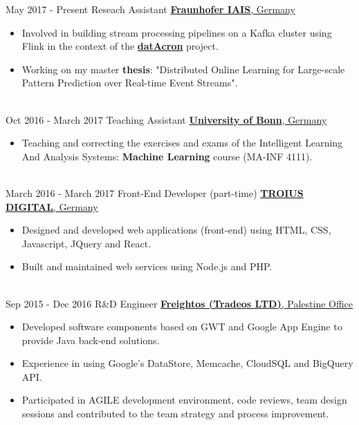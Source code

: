 \documentclass[letterpaper]{twentysecondcv} %
\begin{document}
\begin{twenty} %
	
	\twentyitem
	{May 2017 -}
	{Present}
	{Reseach Assistant}
	{\href{https://www.iais.fraunhofer.de/?L=1}{\large\textbf{Fraunhofer IAIS}, Germany}}
	{}
	{\begin{itemize}
			\item Involved in building stream processing pipelines on a Kafka cluster using Flink in the context of the \href{http://www.datacron-project.eu/}{\textbf{datAcron}} project.
			
			\item Working on my master \textbf{thesis}: "Distributed Online Learning for Large-scale Pattern Prediction over Real-time Event Streams".
	\end{itemize}}
\\
		\twentyitem
	{Oct 2016 - }
	{March 2017}
	{Teaching Assistant}
	{\href{https://www.kdml.iai.uni-bonn.de/teaching/winter-2016-17}{\large\textbf{University of Bonn}, Germany}}
	{}
	 {\begin{itemize}
			\item Teaching and correcting the exercises and exams of the Intelligent Learning ​ And Analysis Systems:\textbf{ Machine Learning} course (MA-INF 4111).
	\end{itemize}}


        \\
	\twentyitem
    	{March 2016 -}
		{March 2017}
        {Front-End Developer (part-time)}
        {\href{https://twitter.com/TROIUS_DIGITAL}{\large\textbf{TROIUS DIGITAL}, Germany}}
        {}
        {
        {\begin{itemize}
        \item Designed and developed web applications (front-end) using HTML, CSS, Javascript, JQuery and React.
        \item Built and maintained web services using Node.js and PHP.
    \end{itemize}}
        }
    \\   
    \twentyitem
   		{Sep 2015 -}
		{Dec 2016}
        {R\&D Engineer}
        {\href{https://www.freightos.com/}{\large\textbf{Freightos (Tradeos LTD)}, Palestine Office}}
        {}
        {
        {\begin{itemize}
        \item Developed software components based on GWT and Google App Engine to provide Java back-end solutions.
        \item Experience in using Google's DataStore, Memcache, CloudSQL and BigQuery API.
        \item Participated in AGILE development environment, code reviews, team design sessions and contributed to the team strategy and process improvement.
        

\end{itemize}}}
\end{twenty}
\end{document}
